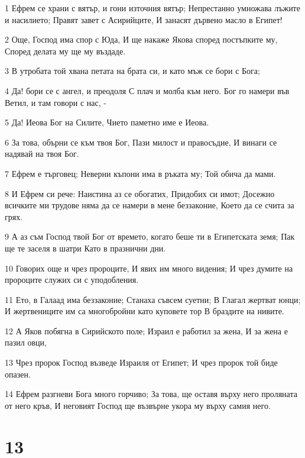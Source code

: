 \par 1 Ефрем се храни с вятър, и гони източния вятър; Непрестанно умножава лъжите и насилието; Правят завет с Асирийците, И занасят дървено масло в Египет!
\par 2 Още, Господ има спор с Юда, И ще накаже Якова според постъпките му, Според делата му ще му въздаде.
\par 3 В утробата той хвана петата на брата си, и като мъж се бори с Бога;
\par 4 Да! бори се с ангел, и преодоля С плач и молба към него. Бог го намери във Ветил, и там говори с нас, -
\par 5 Да! Иеова Бог на Силите, Чието паметно име е Иеова.
\par 6 За това, обърни се към твоя Бог, Пази милост и правосъдие, И винаги се надявай на твоя Бог.
\par 7 Ефрем е търговец; Неверни къпони има в ръката му; Той обича да мами.
\par 8 И Ефрем си рече: Наистина аз се обогатих, Придобих си имот; Досежно всичките ми трудове няма да се намери в мене беззаконие, Което да се счита за грях.
\par 9 А аз съм Господ твой Бог от времето, когато беше ти  в Египетската земя; Пак ще те заселя в шатри Като в празнични дни.
\par 10 Говорих още и чрез пророците, И явих им много видения; И чрез думите на пророците служих си с уподобления.
\par 11 Ето, в Галаад има беззаконие; Станаха съвсем суетни; В Глагал жертват юнци; И жертвениците им са многобройни като куповете тор В браздите на нивите.
\par 12 А Яков побягна в Сирийското поле; Израил е работил за жена, И за жена е пазил овци,
\par 13 Чрез пророк Господ възведе Израиля от Египет; И чрез пророк той биде опазен.
\par 14 Ефрем разгневи Бога много горчиво; За това, ще оставя върху него проляната от него кръв, И неговият Господ ще възвърне укора му върху самия него.

\chapter{13}

